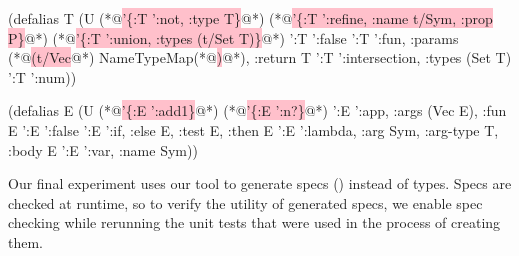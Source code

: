 \begin{minipage}[t]{0.54\linewidth}
\begin{cljlisting}
(defalias T
  (U (*@\colorbox{pink}{'\{:T ':not, :type T\}}@*)
     (*@\colorbox{pink}{'\{:T ':refine, :name t/Sym, :prop P\}}@*)
     (*@\colorbox{pink}{'\{:T ':union, :types (t/Set T)\}}@*)
     '{:T ':false}
     '{:T ':fun,
       :params (*@\colorbox{pink}{(t/Vec}@*) NameTypeMap(*@\colorbox{pink}{)}@*),
       :return T}
     '{:T ':intersection, :types (Set T)}
     '{:T ':num}))
\end{cljlisting}
\end{minipage}
%
\begin{minipage}[t]{0.4\linewidth}
\begin{cljlisting}
(defalias E
  (U (*@\colorbox{pink}{'\{:E ':add1\}}@*)
     (*@\colorbox{pink}{'\{:E ':n?\}}@*)
     '{:E ':app, :args (Vec E),
       :fun E}
     '{:E ':false}
     '{:E ':if, :else E,
       :test E, :then E}
     '{:E ':lambda, :arg Sym,
       :arg-type T, :body E}
     '{:E ':var, :name Sym}))
\end{cljlisting}
\end{minipage}






\label{infer:sec:experiment3}

Our final experiment uses our tool to
generate specs ()
instead of types.
Specs are checked at runtime,
so to verify the utility of generated specs,
we enable spec checking while
rerunning the unit tests that were used
in the process of creating them.

